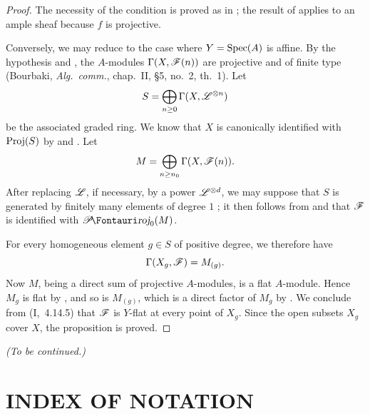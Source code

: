\begin{proof}
The necessity of the condition is proved as in
; the result of  applies
to an ample sheaf because $f$ is projective.

Conversely, we may reduce to the case where
$Y=\operatorname{Spec}(A)$ is affine.  By the hypothesis and
, the $A$-modules
$\Gamma(X,\mathscr{F}(n))$ are projective and of finite type
(Bourbaki, \emph{Alg.~comm.}, chap.~II, \S5, no.~2,
th.~1).  Let
\[
  S=\bigoplus_{n\geq0}\Gamma(X,\mathscr{L}^{\otimes n})
\]
be the associated graded ring.  We know that $X$ is
canonically identified with $\operatorname{Proj}(S)$ by
 and .  Let
\[
  M=\bigoplus_{n\geq n_0}\Gamma(X,\mathscr{F}(n)).
\]
After replacing $\mathscr{L}$, if necessary, by a power
$\mathscr{L}^{\otimes d}$, we may suppose that $S$ is
generated by finitely many elements of degree $1$
; it then follows from
 and  that $\mathscr{F}$ is
identified with $\shProj_0(M)$.

For every homogeneous element $g\in S$ of positive
degree, we therefore have
\[
  \Gamma(X_g,\mathscr{F})=M_{(g)}.
\]
Now $M$, being a direct sum of projective $A$-modules, is
a flat $A$-module.  Hence $M_g$ is flat by
, and so is $M_{(g)}$, which is a direct
factor of $M_g$ by .  We conclude from
(I,~4.14.5) that $\mathscr{F}$ is $Y$-flat at every
point of $X_g$.  Since the open subsets $X_g$ cover $X$,
the proposition is proved.
\end{proof}

\bigskip
\noindent\emph{(To be continued.)}

\clearpage
{}
\section*{INDEX OF NOTATION}


